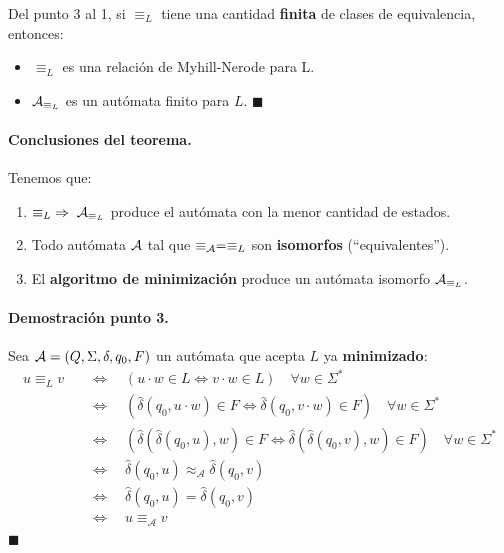 Del punto 3 al 1, si $\equiv_L$ tiene una cantidad \textbf{finita} de clases de equivalencia, entonces:
\begin{itemize}
    \item $\equiv_L$ es una relación de Myhill-Nerode para L.
    \item $\mathcal{A}_{\equiv_L}$ es un autómata finito para $L$. \hfill $\blacksquare$
\end{itemize}

\paragraph{Conclusiones del teorema.} Tenemos que:
\begin{enumerate}
    \item $\equiv_L \; \Rightarrow \; \mathcal{A}_{\equiv_L}$ produce el autómata con la menor cantidad de estados.
    \item Todo autómata $\mathcal{A}$ tal que $\equiv_{\mathcal{A}} = \equiv_L$ son \textbf{isomorfos} (``equivalentes'').
    \item El \textbf{algoritmo de minimización} produce un autómata isomorfo $\mathcal{A}_{\equiv_L}$.
\end{enumerate}

\paragraph{Demostración punto 3.} Sea $\mathcal{A} = (Q,\Sigma,\delta,q_0,F)$ un autómata que acepta $L$ ya \textbf{minimizado}:
$$
    \begin{aligned}
        u \equiv_L v \quad & \Leftrightarrow \quad(u \cdot w \in L \Leftrightarrow v \cdot w \in L) \quad \forall w \in \Sigma^*                                                                                                                \\
                           & \Leftrightarrow \quad\left(\hat{\delta}\left(q_0, u \cdot w\right) \in F \Leftrightarrow \hat{\delta}\left(q_0, v \cdot w\right) \in F\right) \quad \forall w \in \Sigma^*                                         \\
                           & \Leftrightarrow \quad\left(\hat{\delta}\left(\hat{\delta}\left(q_0, u\right), w\right) \in F \Leftrightarrow \hat{\delta}\left(\hat{\delta}\left(q_0, v\right), w\right) \in F\right) \quad \forall w \in \Sigma^* \\
                           & \Leftrightarrow \quad \hat{\delta}\left(q_0, u\right) \approx_\mathcal{A} \hat{\delta}\left(q_0, v\right)                                                                                                          \\
                           & \Leftrightarrow \quad \hat{\delta}\left(q_0, u\right)=\hat{\delta}\left(q_0, v\right)                                                                                                                              \\
                           & \Leftrightarrow \quad u \equiv_\mathcal{A} v
    \end{aligned}
$$
\hfill $\blacksquare$


